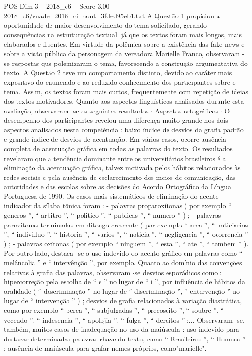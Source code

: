 \begin{textsample}{POS Dim 3 – 2018\_c6 – Score 3.00 – 2018\_c6/enade\_2018\_ci\_cont\_3fded95eb1.txt}
A Questão 1 propiciou a oportunidade de maior desenvolvimento do tema solicitado, gerando consequências na estruturação textual, já que os textos foram mais longos, mais elaborados e fluentes.
Em virtude da polêmica sobre a existência das fake news e sobre a visão pública da personagem da vereadora Marielle Franco, observaram -se respostas que polemizaram o tema, favorecendo a construção argumentativa do texto.
A Questão 2 teve um comportamento distinto, devido ao caráter mais expositivo do enunciado e ao reduzido conhecimento dos participantes sobre o tema.
Assim, os textos foram mais curtos, frequentemente com repetição de ideias dos textos motivadores.
Quanto aos aspectos linguísticos analisados durante esta avaliação, observaram -se os seguintes resultados : Aspectos ortográficos : O desempenho dos participantes revelou uma diferença muito grande nos dois aspectos analisados nesta competência : baixo índice de desvios da grafia padrão e grande índice de desvios de acentuação.
Em vários casos, ocorre ausência completa de acentuação gráfica em todas as palavras do texto.
Os resultados revelaram que a tendência dominante entre os universitários brasileiros é a eliminação da acentuação gráfica, talvez motivada pelos hábitos relacionados às redes sociais e pela ausência de esclarecimento dos meios de comunicação, das autoridades e das escolas sobre as decisões do Acordo Ortográfico da Língua Portuguesa de 1990.
Os casos mais sistemáticos de eliminação do acento indicador da sílaba tônica foram : - palavras proparoxítonas ( por exemplo “ generos ”, “ arbitro ”, “ politico ”, “ publicas ”, “ numero ” ) ; - palavras paroxítonas terminadas em ditongo crescente ( por exemplo “ area ”, “ noticiarios ”, “ individuo ”, “ historia ”, “ varios ”, “ noticia ”, “ negligencia ”, “ ocorrencia ” ) ; - palavras oxítonas ( por exemplo “ ninguem ”, “ esta ”, “ ate ”, “ tambem ” ).
Por outro lado, destaca -se o uso indevido do acento gráfico em palavras como “ melâncolia ” e “ intervênção ”, por exemplo.
Quanto ao domínio das convenções relativas à grafia das palavras, observaram -se desvios esporádicos como : hipercorreção pela escolha de “ e ” no lugar de “ i ”, por influência de hábitos da oralidade ( “ descriminação ” no lugar de “ discriminação ”, “ entervenção ” no lugar de “ intervenção ” ) ; desvios de grafia relacionados à variação diastrática, como por exemplo “ perca ”, “ subjulgadas ”, “ precoseito ”, “ soubre ”, “ vecendo ”, “ indesencia ”, “ apolojia ”, “ fulga ”, “ dereitos ” ;...
Observaram -se, também, muitos casos de inadequação no uso da maiúscula : uso indevido para destacar determinadas palavras-chave do texto, como “ Brasileiros ”, “ Homens ” ; ausência de maiúscula para grafar nomes próprios, como"marielle".

\end{textsample}

